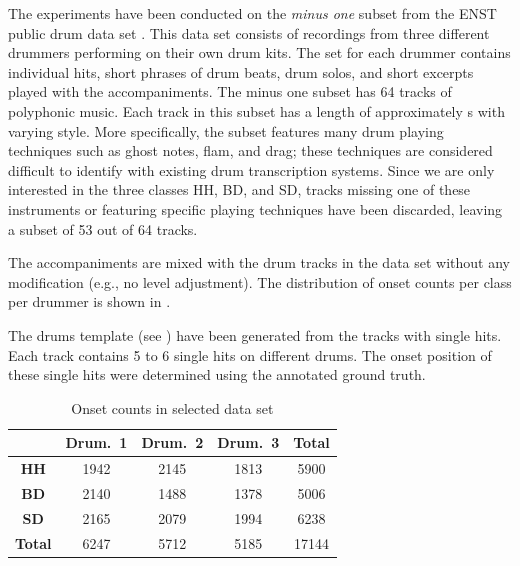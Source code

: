 \documentclass{article}
\begin{document}
The experiments have been conducted on the \textit{minus one} subset from the ENST public drum data set \cite{Gillet2006}. This data set consists of recordings from three different drummers performing on their own drum kits. The set for each drummer contains individual hits, short phrases of drum beats, drum solos, and short excerpts played with the accompaniments. The minus one subset has 64 tracks of polyphonic music. Each track in this subset has a length of approximately \unit[70]{s} with varying style. More specifically, the subset features many drum playing techniques such as ghost notes, flam, and drag; these techniques are considered difficult to identify with existing drum transcription systems. Since we are only interested in the three classes HH, BD, and SD, tracks missing one of these instruments or featuring specific playing techniques have been discarded, leaving a subset of 53 out of 64 tracks.

The accompaniments are mixed with the drum tracks in the data set without any modification (e.g., no level adjustment). The distribution of onset counts per class per drummer is shown in . %

The drums template (see ) have been generated from the tracks with single hits. Each track contains 5 to 6 single hits on different drums. The onset position of these single hits were determined using the annotated ground truth. 
 
\begin{table}[h]
\begin{center}
\begin{tabular}{|c|c|c|c|c|}
\hline
 & \textbf{Drum.~1}    & \textbf{Drum.~2}    & \textbf{Drum.~3}    & \textbf{Total} \\ \hline
\textbf{HH}        & 1942 & 2145 & 1813 & 5900  \\ \hline
\textbf{BD}        & 2140 & 1488 & 1378 & 5006  \\ \hline
\textbf{SD}        & 2165 & 2079 & 1994 & 6238  \\ \hline
\textbf{Total}     & 6247 & 5712 & 5185 & 17144 \\ \hline
\end{tabular}
 \caption{Onset counts in selected data set}%
 \label{tab:onsetCount}
\end{center}
\end{table}
\end{document}
